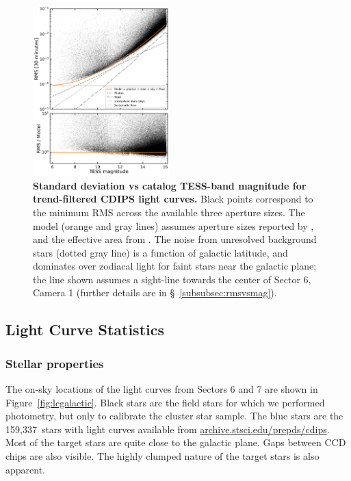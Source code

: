 \documentclass[12pt,twocolumn,tighten]{aastex62}
\newcommand{\numberlcs}{159{,}337\ } %
\newcommand{\stscilink} {\url{archive.stsci.edu/prepds/cdips}}
\begin{document}
\begin{figure}[t]
	\begin{center}
		\leavevmode
		\includegraphics[width=0.47\textwidth]{rms_vs_mag.png}
	\end{center}
	\vspace{-0.5cm}
	\caption{ {\bf Standard deviation vs catalog TESS-band magnitude for
			trend-filtered CDIPS light curves.} 
		Black points correspond to the minimum RMS across the available three
		aperture sizes.  
		The model (orange and gray lines) assumes aperture sizes reported 
		by \citet{Sullivan_et_al_2015}, and the effective area from 
		\citet{vanderspek_2018}.
		The noise from unresolved background stars (dotted gray line) is a function 
		of galactic latitude, and dominates over zodiacal light
		for faint stars near the galactic plane; the line shown assumes a
		sight-line towards the center of Sector 6, Camera 1 (further details
		are in \S~\ref{subsubsec:rmsvsmag}).
		\label{fig:rms_vs_mag}
	}
\end{figure}



\subsection{Light Curve Statistics}
\label{subsec:lcstatistics}

\subsubsection{Stellar properties}

The on-sky locations of the light curves from Sectors 6 and 7
are shown in Figure~\ref{fig:lcgalactic}.
Black stars are the field stars for which we performed photometry,
but only to calibrate the cluster star sample.
The blue stars are the \numberlcs stars with light curves available
from \stscilink.
Most of the target stars are quite close to the galactic plane.
Gaps between CCD chips are also visible.
The highly clumped nature of the target stars is also apparent.
\end{document}
